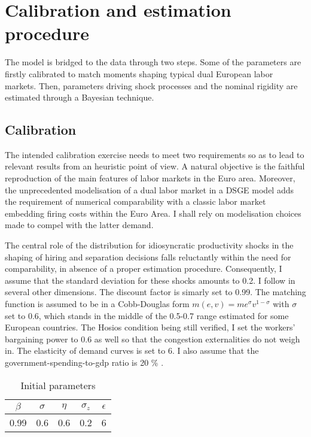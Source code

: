 \section{Calibration and estimation procedure}

The model is bridged to the data through two steps. Some of the parameters are firstly calibrated to match moments shaping typical dual European labor markets. Then, parameters driving shock processes and the nominal rigidity are estimated through a Bayesian technique. 

\subsection{Calibration}

The intended calibration exercise needs to meet two requirements so as to lead to relevant results from an heuristic point of view. A natural objective is the faithful reproduction of the main features of labor markets in the Euro area. Moreover, the unprecedented modelisation of a dual labor market in a DSGE model adds the requirement of numerical comparability with a classic labor market embedding firing costs within the Euro Area. I shall rely on modelisation choices \citet{thomas2009labor} made to compel with the latter demand.

The central role of the distribution for idiosyncratic productivity shocks in the shaping of hiring and separation decisions falls reluctantly within the need for comparability, in absence of a proper estimation procedure. Consequently, I assume that the standard deviation for these shocks amounts to 0.2. I follow \citet{thomas2009labor} in several other dimensions. The discount factor is simarly set to 0.99. The matching function is assumed to be in a Cobb-Douglas form $m\left(e,v\right) = m e^{\sigma} v^{1-\sigma}$ with $\sigma$ set to 0.6, which stands in the middle of the 0.5-0.7 range \citet{burda1994gross} estimated for some European countries. The Hosios condition being still verified, I set the workers' bargaining power to 0.6 as well so that the congestion externalities do not weigh in. The elasticity of demand curves is set to 6. I also assume that the government-spending-to-gdp ratio is 20 \% .

\begin{table}[H]
\centering
\begin{tabular}{c c c c c}
\toprule
$\beta$ & $\sigma$ & $\eta$ & $\sigma_z$ & $\epsilon$\\
\midrule
0.99 & 0.6 & 0.6 & 0.2 & 6\\
\bottomrule
\end{tabular}
\caption{Initial parameters \label{parameters}}
\end{table}

